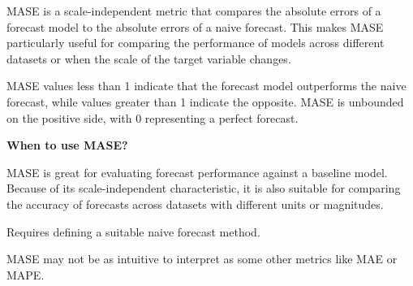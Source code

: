 MASE is a scale-independent metric that compares the absolute errors of a forecast model to the absolute errors of a naive forecast.
This makes MASE particularly useful for comparing the performance of models across different datasets or when the scale of the target variable changes.
\vspace{0.5em}
\begin{center}
\end{center}
\vspace{0.5em}
MASE values less than 1 indicate that the forecast model outperforms the naive forecast, while values greater than 1 indicate the opposite.
MASE is unbounded on the positive side, with 0 representing a perfect forecast.

\textbf{When to use MASE?}

MASE is great for evaluating forecast performance against a baseline model. Because of its scale-independent characteristic, it is also suitable for comparing the accuracy
of forecasts across datasets with different units or magnitudes.

{
    \item Requires defining a suitable naive forecast method.    
    \item MASE may not be as intuitive to interpret as some other metrics like MAE or MAPE.
}

